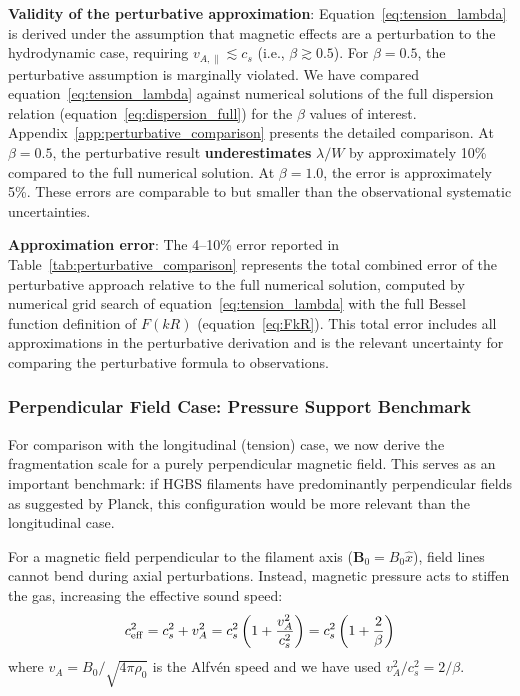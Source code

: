 \documentclass[11pt,a4paper]{article}
\begin{document}
\textbf{Validity of the perturbative approximation}: Equation~\ref{eq:tension_lambda} is derived under the assumption that magnetic effects are a perturbation to the hydrodynamic case, requiring $v_{A,\parallel} \lesssim c_s$ (i.e., $\beta \gtrsim 0.5$). For $\beta = 0.5$, the perturbative assumption is marginally violated. We have compared equation~\ref{eq:tension_lambda} against numerical solutions of the full dispersion relation (equation~\ref{eq:dispersion_full}) for the $\beta$ values of interest. Appendix~\ref{app:perturbative_comparison} presents the detailed comparison. At $\beta = 0.5$, the perturbative result \textbf{underestimates} $\lambda/W$ by approximately 10\% compared to the full numerical solution. At $\beta = 1.0$, the error is approximately 5\%. These errors are comparable to but smaller than the observational systematic uncertainties.

\textbf{Approximation error}: The 4--10\% error reported in Table~\ref{tab:perturbative_comparison} represents the total combined error of the perturbative approach relative to the full numerical solution, computed by numerical grid search of equation~\ref{eq:tension_lambda} with the full Bessel function definition of $F(kR)$ (equation~\ref{eq:FkR}). This total error includes all approximations in the perturbative derivation and is the relevant uncertainty for comparing the perturbative formula to observations.

\subsubsection{Perpendicular Field Case: Pressure Support Benchmark}
\label{sec:perpendicular_field}

For comparison with the longitudinal (tension) case, we now derive the fragmentation scale for a purely perpendicular magnetic field. This serves as an important benchmark: if HGBS filaments have predominantly perpendicular fields as suggested by Planck, this configuration would be more relevant than the longitudinal case.

For a magnetic field perpendicular to the filament axis ($\mathbf{B}_0 = B_0 \hat{x}$), field lines cannot bend during axial perturbations. Instead, magnetic pressure acts to stiffen the gas, increasing the effective sound speed:
\begin{equation}
c_{\rm eff}^2 = c_s^2 + v_A^2 = c_s^2\left(1 + \frac{v_A^2}{c_s^2}\right) = c_s^2\left(1 + \frac{2}{\beta}\right)
\end{equation}
where $v_A = B_0/\sqrt{4\pi\rho_0}$ is the Alfv\'en speed and we have used $v_A^2/c_s^2 = 2/\beta$.
\end{document}
